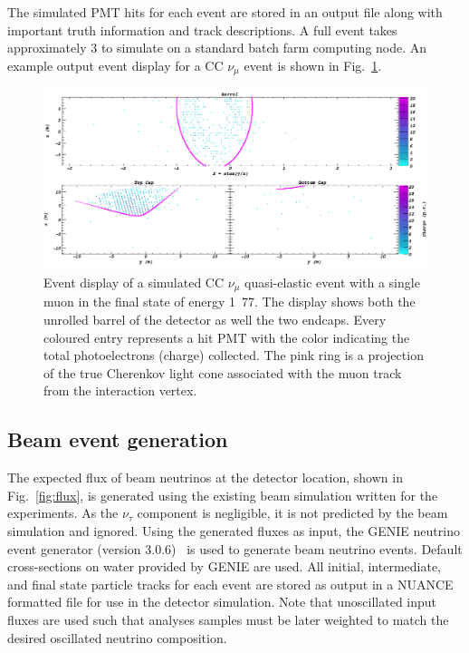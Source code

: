 The simulated PMT hits for each event are stored in an output file along with important truth
information and track descriptions. A full event takes approximately \unit{3}{} to
simulate on a standard batch farm computing node. An example output event display for a CC
$\nu_{\mu}$ event is shown in Fig.~\ref{fig:sim_event}.

\begin{figure} %
    \includegraphics[width=\textwidth]{diagrams/4-chips/sim_event.png}
    \caption[Event display of a simulated beam CC $\nu_{\mu}$ \chipsfive event]
    {Event display of a simulated CC $\nu_{\mu}$ quasi-elastic event with a single muon in the
        final state of energy \unit{1.77}{\GeV}. The display shows both the unrolled barrel of the
        \chipsfive detector as well the two endcaps. Every coloured entry represents a hit PMT
        with the color indicating the total photoelectrons (charge) collected. The pink ring is a
        projection of the true Cherenkov light cone associated with the muon track from the
        interaction vertex.}
    \label{fig:sim_event}
\end{figure}

\subsection{Beam event generation} %
\label{sec:chips_monte_carlo_beam} %

The expected flux of beam neutrinos at the \chipsfive detector location, shown in
Fig.~\ref{fig:flux}, is generated using the existing beam simulation written for the \numi
experiments. As the $\nu_{\tau}$ component is negligible, it is not predicted by the beam
simulation and ignored. Using the generated fluxes as input, the GENIE neutrino event generator
(version 3.0.6)~\cite{andreopoulos2009, andreopoulos2015} is used to generate beam neutrino
events. Default cross-sections on water provided by GENIE are used. All initial, intermediate, and
final state particle tracks for each event are stored as output in a NUANCE formatted file for use
in the detector simulation. Note that unoscillated input fluxes are used such that analyses
samples must be later weighted to match the desired oscillated neutrino composition.

